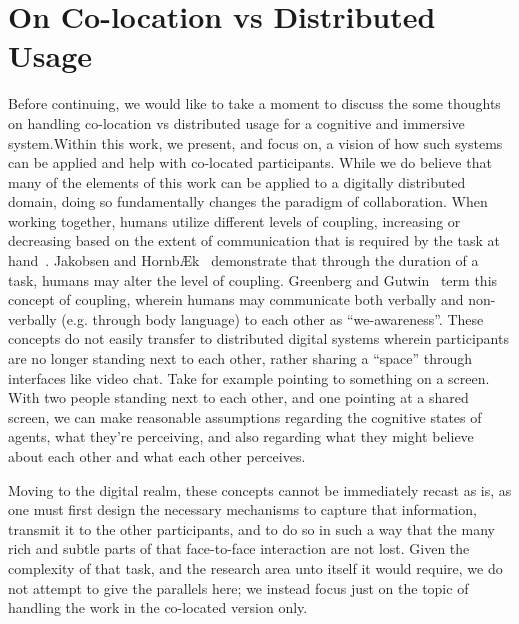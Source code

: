 \section{On Co-location vs Distributed Usage}

Before continuing, we would like to take a moment to discuss the
some thoughts on handling co-location vs distributed usage for a
cognitive and immersive system.Within this work, we present, and focus
on, a vision of how such systems can be applied and help with co-located
participants. While we do believe that many of the elements of this work can be
applied to a digitally distributed domain, doing so fundamentally changes the
paradigm of collaboration. When working together, humans
utilize different levels of coupling, increasing or decreasing based
on the extent of communication that is required by the task at
hand~\cite{salvador_denver_1996,olson_distance_2000}. Jakobsen and
HornbÆk~\cite{jakobsen_up_2014} demonstrate that through the duration of
a task, humans may alter the level of coupling. Greenberg and
Gutwin~\cite{greenberg_implications_2016} term this concept of coupling,
wherein humans may communicate both verbally and non-verbally (e.g.
through body language) to each other as ``we-awareness''. These
concepts do not easily transfer to distributed
digital systems wherein participants are no longer standing next to
each other, rather sharing a ``space'' through interfaces like video
chat. Take for example pointing to something on a screen. With two
people standing next to each other, and one pointing at a shared
screen, we can make reasonable assumptions regarding the cognitive
states of agents, what they're perceiving, and also regarding what
they might believe about each other and what each other perceives.

Moving to the digital realm, these concepts cannot be immediately
recast as is, as one must first design the necessary mechanisms to
capture that information, transmit it to the other participants, and
to do so in such a way that the many rich and subtle parts of that
face-to-face interaction are not lost. Given the complexity of that
task, and the research area unto itself it would require, we do not
attempt to give the parallels here; we instead focus just on the topic
of handling the work in the co-located version only.
